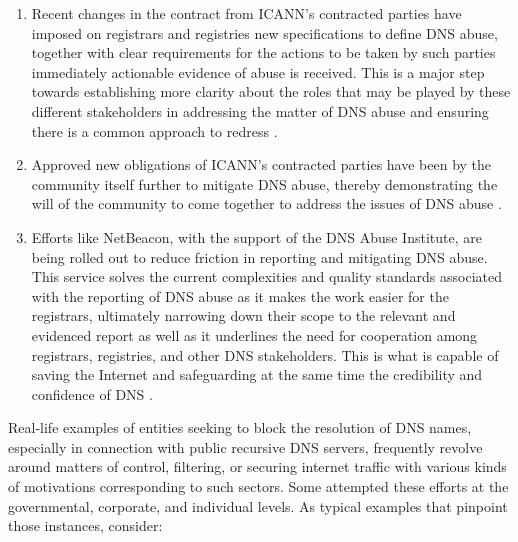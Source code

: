 \begin{enumerate}
  \item Recent changes in the contract from ICANN's contracted parties have imposed on registrars and registries new specifications to define DNS abuse, together with clear requirements for the actions to be taken by such parties immediately actionable evidence of abuse is received. This is a major step towards establishing more clarity about the roles that may be played by these different stakeholders in addressing the matter of DNS abuse and ensuring there is a common approach to redress \cite{Weinstein2023}.
  \item Approved new obligations of ICANN's contracted parties have been by the community itself further to mitigate DNS abuse, thereby demonstrating the will of the community to come together to address the issues of DNS abuse \cite{ICANN2023}.
  \item Efforts like NetBeacon, with the support of the DNS Abuse Institute, are being rolled out to reduce friction in reporting and mitigating DNS abuse. This service solves the current complexities and quality standards associated with the reporting of DNS abuse as it makes the work easier for the registrars, ultimately narrowing down their scope to the relevant and evidenced report as well as it underlines the need for cooperation among registrars, registries, and other DNS stakeholders. This is what is capable of saving the Internet and safeguarding at the same time the credibility and confidence of DNS \cite{NetBeacon}.
  
\end{enumerate}

Real-life examples of entities seeking to block the resolution of DNS names, especially in connection with public recursive DNS servers, frequently revolve around matters of control, filtering, or securing internet traffic with various kinds of motivations corresponding to such sectors. Some attempted these efforts at the governmental, corporate, and individual levels. As typical examples that pinpoint those instances, consider:

